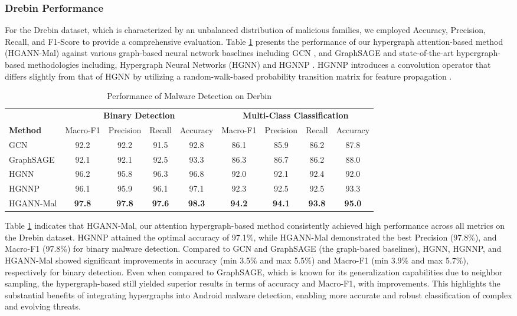 \documentclass[runningheads]{llncs}
\begin{document}
\subsubsection{Drebin Performance}
For the Drebin dataset, which is characterized by an unbalanced distribution of malicious families, we employed Accuracy, Precision, Recall, and F1-Score to provide a comprehensive evaluation. Table \ref{table:performance_Drebin} presents the performance of our hypergraph attention-based method (HGANN-Mal) against various graph-based neural network baselines including GCN \cite{kipf2016semi}, and GraphSAGE \cite{yumlembam2022iot} and state-of-the-art hypergraph-based methodologies including, Hypergraph Neural Networks (HGNN) and  HGNNP  \cite{zhang2023}. HGNNP introduces a convolution operator that differs slightly from that of HGNN by utilizing a random-walk-based probability transition matrix for feature propagation \cite{gao2023}.

\begin{table}[h]
\centering
\caption{Performance of Malware Detection on Derbin}
\begin{tabular}{lcccccccc}
\toprule
& \multicolumn{4}{c}{\textbf{Binary Detection}} & \multicolumn{4}{c}{\textbf{Multi-Class Classification}} \\
\cmidrule(lr){2-5} \cmidrule(lr){6-9}
\textbf{Method} & Macro-F1 & Precision & Recall & Accuracy & Macro-F1 & Precision & Recall & Accuracy \\
\midrule
GCN       & 92.2 & 92.2 & 91.5 & 92.8 & 86.1 & 85.9 & 86.2 & 87.8 \\
GraphSAGE & 92.1 & 92.1 & 92.5 & 93.3 & 86.3 & 86.7 & 86.2 & 88.0 \\
\midrule
HGNN      & 96.2 & 95.8 & 96.3 & 96.8 & 92.0 & 92.1 & 92.4 & 92.0 \\
HGNNP     & 96.1 & 95.9 & 96.1 & 97.1 & 92.3 & 92.5 & 92.5 & 93.3 \\
HGANN-Mal  & \textbf{97.8} & \textbf{97.8} & \textbf{97.6} & \textbf{98.3} & \textbf{94.2} & \textbf{94.1} & \textbf{93.8} & \textbf{95.0} \\
\bottomrule
\end{tabular}
\label{table:performance_Drebin}
\end{table}

Table \ref{table:performance_Drebin} indicates that HGANN-Mal, our attention hypergraph-based method consistently achieved high performance across all metrics on the Drebin dataset. HGNNP attained the optimal accuracy of 97.1\%, while HGANN-Mal demonstrated the best Precision (97.8\%), and Macro-F1 (97.8\%) for binary malware detection. Compared to GCN and GraphSAGE (the graph-based baselines), HGNN, HGNNP, and HGANN-Mal showed significant improvements in accuracy (min 3.5\% and max 5.5\%) and  Macro-F1 (min 3.9\% and max 5.7\%), respectively for binary detection. Even when compared to GraphSAGE, which is known for its generalization capabilities due to neighbor sampling, the hypergraph-based still yielded superior results in terms of accuracy and Macro-F1, with improvements. This highlights the substantial benefits of integrating hypergraphs into Android malware detection, enabling more accurate and robust classification of complex and evolving threats.
\end{document}
